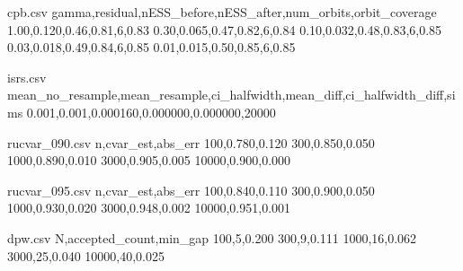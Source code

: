 \begin{filecontents*}{cpb.csv}
gamma,residual,nESS_before,nESS_after,num_orbits,orbit_coverage
1.00,0.120,0.46,0.81,6,0.83
0.30,0.065,0.47,0.82,6,0.84
0.10,0.032,0.48,0.83,6,0.85
0.03,0.018,0.49,0.84,6,0.85
0.01,0.015,0.50,0.85,6,0.85
\end{filecontents*}

\begin{filecontents*}{isrs.csv}
mean_no_resample,mean_resample,ci_halfwidth,mean_diff,ci_halfwidth_diff,sims
0.001,0.001,0.000160,0.000000,0.000000,20000
\end{filecontents*}

\begin{filecontents*}{rucvar_090.csv}
n,cvar_est,abs_err
100,0.780,0.120
300,0.850,0.050
1000,0.890,0.010
3000,0.905,0.005
10000,0.900,0.000
\end{filecontents*}

\begin{filecontents*}{rucvar_095.csv}
n,cvar_est,abs_err
100,0.840,0.110
300,0.900,0.050
1000,0.930,0.020
3000,0.948,0.002
10000,0.951,0.001
\end{filecontents*}

\begin{filecontents*}{dpw.csv}
N,accepted_count,min_gap
100,5,0.200
300,9,0.111
1000,16,0.062
3000,25,0.040
10000,40,0.025
\end{filecontents*}

\documentclass[10pt]{article}
\usepackage[margin=1in]{geometry}
\usepackage[T1]{fontenc}
\usepackage{lmodern}
\usepackage{textcomp}
\usepackage{amsmath,amssymb,amsfonts,amsthm}
\usepackage{mathtools}
\usepackage{graphicx}
\usepackage{booktabs}
\usepackage{algorithm}
\usepackage{algpseudocode}
\usepackage{enumitem}
\usepackage{microtype}
\usepackage{hyperref}
\usepackage[capitalise,nameinlink]{cleveref}
\usepackage{xspace}
\usepackage{adjustbox}
\usepackage{pgfplots}
\usepackage{pgfplotstable}
\usepackage{verbatim}
\usepackage{float}
\pgfplotsset{compat=1.17}

\newcommand{\sCRF}{\textsc{Street\textendash CRF}\xspace}
\newcommand{\CFRplus}{\ensuremath{\mathrm{CFR}^{+}}\xspace}
\newcommand{\E}{\mathbb{E}}
\newcommand{\Var}{\mathrm{Var}}
\newcommand{\KL}{\mathrm{KL}}
\newcommand{\CVaR}{\mathrm{CVaR}}
\newcommand{\VaR}{\mathrm{VaR}}
\newcommand{\BR}{\mathrm{BR}}
\newcommand{\States}{\mathcal{S}}
\newcommand{\Actions}{\mathcal{A}}
\newcommand{\IS}{\mathcal{I}}
\newcommand{\Players}{\mathcal{N}}
\newcommand{\Chance}{\mathsf{C}}
\newcommand{\Bel}{\rho}
\newcommand{\1}{\mathbf{1}}
\newcommand{\R}{\mathbb{R}}

